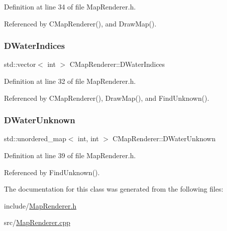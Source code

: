 Definition at line 34 of file Map\+Renderer.\+h.



Referenced by C\+Map\+Renderer(), and Draw\+Map().

\hypertarget{classCMapRenderer_af82295ac61f841481490da6f2b433db2}{}\label{classCMapRenderer_af82295ac61f841481490da6f2b433db2} 
\subsubsection{\texorpdfstring{D\+Water\+Indices}{DWaterIndices}}
{\footnotesize\ttfamily std\+::vector$<$ int $>$ C\+Map\+Renderer\+::\+D\+Water\+Indices\hspace{0.3cm}{\ttfamily [protected]}}



Definition at line 32 of file Map\+Renderer.\+h.



Referenced by C\+Map\+Renderer(), Draw\+Map(), and Find\+Unknown().

\hypertarget{classCMapRenderer_a4b2db86f9cb097d28e0bb3b29eb90194}{}\label{classCMapRenderer_a4b2db86f9cb097d28e0bb3b29eb90194} 
\subsubsection{\texorpdfstring{D\+Water\+Unknown}{DWaterUnknown}}
{\footnotesize\ttfamily std\+::unordered\+\_\+map$<$ int, int $>$ C\+Map\+Renderer\+::\+D\+Water\+Unknown\hspace{0.3cm}{\ttfamily [protected]}}



Definition at line 39 of file Map\+Renderer.\+h.



Referenced by Find\+Unknown().



The documentation for this class was generated from the following files\+:\begin{DoxyCompactItemize}
\item 
include/\hyperlink{MapRenderer_8h}{Map\+Renderer.\+h}\item 
src/\hyperlink{MapRenderer_8cpp}{Map\+Renderer.\+cpp}\end{DoxyCompactItemize}

